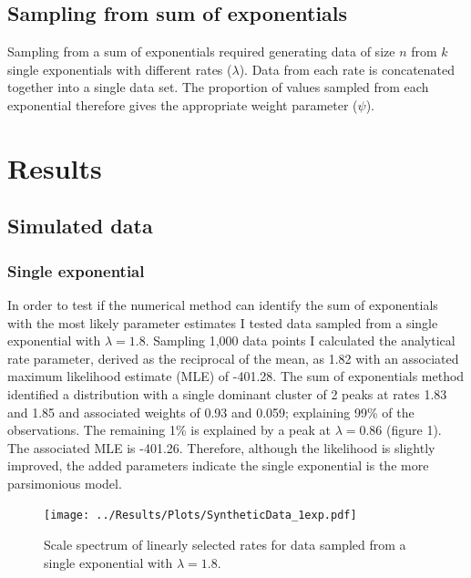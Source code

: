 \documentclass[11pt,usenames,dvipsnames,a4paper]{article}
\begin{document}
\subsection{Sampling from sum of exponentials}
\begin{linenumbers}
\hspace{\parindent}
Sampling from a sum of exponentials required generating data of size $n$ from $k$ single exponentials with different rates ($\lambda$). Data from each rate is concatenated together into a single data set. The proportion of values sampled from each exponential therefore gives the appropriate weight parameter ($\psi$).
\end{linenumbers}

\section{Results}

\noindent
\subsection{Simulated data}

\subsubsection{Single exponential}

\begin{linenumbers}
\hspace{\parindent}
In order to test if the numerical method can identify the sum of exponentials with the most likely parameter estimates I tested data sampled from a single exponential with $\lambda = 1.8$. Sampling 1,000 data points I calculated the analytical rate parameter, derived as the reciprocal of the mean, as 1.82 with an associated maximum likelihood estimate (MLE) of -401.28. The sum of exponentials method identified a distribution with a single dominant cluster of 2 peaks at rates 1.83 and 1.85 and associated weights of 0.93 and 0.059; explaining 99\% of the observations. The remaining 1\% is explained by a peak at $\lambda = 0.86$ (figure 1). The associated MLE is -401.26. Therefore, although the likelihood is slightly improved, the added parameters indicate the single exponential is the more parsimonious model.
\end{linenumbers}
\begin{figure}[H]
	\centering
	\texttt{[image: ../Results/Plots/SyntheticData\_1exp.pdf]}
	\caption{Scale spectrum of linearly selected rates for data sampled from a single exponential with $\lambda = 1.8$.}
\end{figure}
\end{document}
